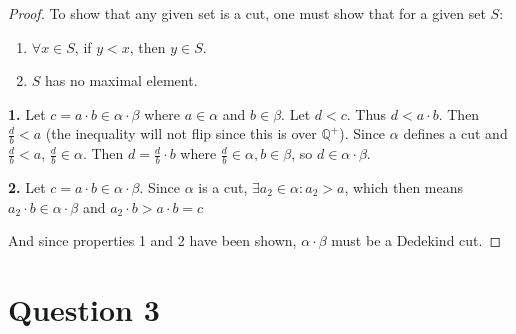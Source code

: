 \documentclass[12pt, letterpaper]{article}
\begin{document}
\begin{proof}

\noindent To show that any given set is a cut, one must show that for a given set $S$:
\begin{enumerate}
  \item $\forall x \in S$, if $y < x$, then $y \in S$.
  \item $S$ has no maximal element.
\end{enumerate}

\noindent\textbf{1.} Let $c = a \cdot b \in \alpha \cdot \beta$ where $a \in \alpha$ and $b \in \beta$. Let $d < c$. Thus $d < a \cdot b$. Then $\frac{d}{b} < a$ (the inequality will not flip since this is over $\mathbb{Q}^+$).
Since $\alpha$ defines a cut and $\frac{d}{b} < a$, $\frac{d}{b} \in \alpha$. Then $d = \frac{d}{b} \cdot b$ where $\frac{d}{b} \in \alpha, b \in \beta$, so $d \in \alpha \cdot \beta$.

\noindent\textbf{2.} Let $c = a \cdot b \in \alpha \cdot \beta$. Since $\alpha$ is a cut, $\exists a_2 \in \alpha: a_2 > a$,
 which then means $a_2 \cdot b \in \alpha \cdot \beta$ and $ a_2 \cdot b > a \cdot b = c$

\noindent And since properties 1 and 2 have been shown, $\alpha \cdot \beta$ must be a Dedekind cut.
\end{proof}
\pagebreak
\section{Question 3}
\end{document}
